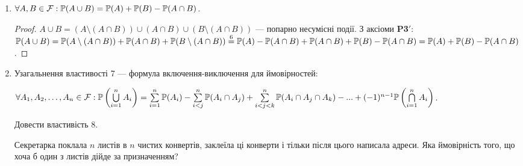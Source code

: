 \begin{enumerate}
\begin{proof}
    \end{proof}
    \item $\forall A, B \in \mathcal{F}: \P(A \cup B) = \P(A) + \P(B) - \P(A \cap B)$.
    \begin{proof}
        $A \cup B = (A\setminus(A \cap B)) 
        \cup (A \cap B) 
        \cup (B\setminus(A \cap B))$ --- попарно несумісні події. 
        \newline
        З аксіоми \textbf{P3$'$}: $\P(A \cup B) = \P(A\setminus(A \cap B)) 
        + \P(A \cap B) + \P(B\setminus(A \cap B)) \overset{6}{=} \P(A) - \P(A \cap B) + \P(A \cap B)
        + \P(B) - \P(A \cap B) = \P(A) + \P(B) - \P(A \cap B)$.
    \end{proof}
    \item Узагальнення властивості 7 --- формула включення-виключення для ймовірностей: 
    
    \begin{math}
        \forall A_1, A_2, \dots, A_n \in \mathcal{F} 
    : \P\left(\bigcup\limits_{i=1}^n A_i\right) = \sum\limits_{i=1}^n \P(A_i) - \sum\limits_{i < j}^n \P(A_i \cap A_j)
    + \sum\limits_{i < j < k}^n \P(A_i \cap A_j \cap A_k) - ... + (-1)^{n-1}\P\left(\bigcap\limits_{i=1}^n A_i\right)
    \end{math}.
    \nopagebreak
    \begin{exercise}
        Довести властивість 8.
    \end{exercise}
\begin{example}
    Секретарка поклала $n$ листів в $n$ чистих конвертів, заклеїла ці конверти і тільки 
    після цього написала адреси. Яка ймовірність того, що хоча б один з листів дійде 
    за призначенням?
    

\end{example}
\end{enumerate}
